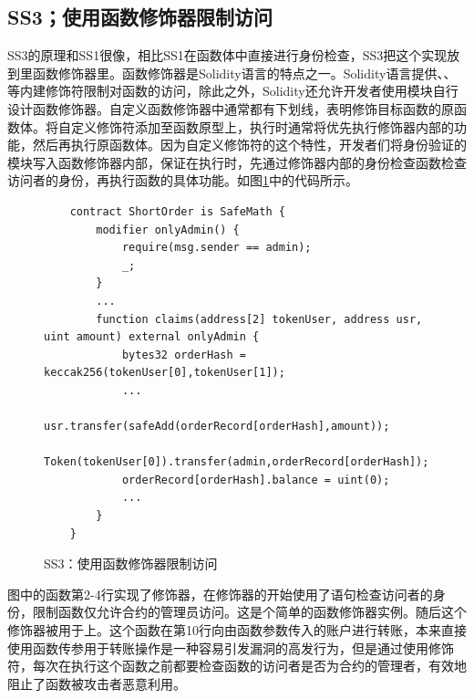 \subsection{SS3；使用函数修饰器限制访问}\label{sec:ss3}
SS3的原理和SS1很像，相比SS1在函数体中直接进行身份检查，SS3把这个实现放到里函数修饰器里。函数修饰器是Solidity语言的特点之一。Solidity语言提供、、等内建修饰符限制对函数的访问，除此之外，Solidity还允许开发者使用模块自行设计函数修饰器。自定义函数修饰器中通常都有下划线\codeff{\_;}，表明修饰目标函数的原函数体。将自定义修饰符添加至函数原型上，执行时通常将优先执行修饰器内部的功能，然后再执行原函数体。因为自定义修饰符的这个特性，开发者们将身份验证的模块写入函数修饰器内部，保证在执行时，先通过修饰器内部的身份检查函数检查访问者的身份，再执行函数的具体功能。如图\ref{fig:ss3_example}中的代码所示。
\begin{figure}
\begin{minipage}[htbp]{1.0\linewidth}
    \begin{lstlisting}
    contract ShortOrder is SafeMath {
        modifier onlyAdmin() {
            require(msg.sender == admin);
            _;
        }
        ...
        function claims(address[2] tokenUser, address usr, uint amount) external onlyAdmin {
            bytes32 orderHash = keccak256(tokenUser[0],tokenUser[1]);
            ...
            usr.transfer(safeAdd(orderRecord[orderHash],amount));
            Token(tokenUser[0]).transfer(admin,orderRecord[orderHash]);
            orderRecord[orderHash].balance = uint(0);
            ...
        }
    }
\end{lstlisting}
\end{minipage}
\vspace{-5mm}
\caption{SS3：使用函数修饰器限制访问}
\label{fig:ss3_example}
\end{figure}
图中的函数第2-4行实现了修饰器，在修饰器的开始使用了语句检查访问者的身份，限制函数仅允许合约的管理员访问。这是个简单的函数修饰器实例。随后这个修饰器被用于上。这个函数在第10行向由函数参数传入的账户进行转账，本来直接使用函数传参用于转账操作是一种容易引发漏洞的高发行为，但是通过使用修饰符，每次在执行这个函数之前都要检查函数的访问者是否为合约的管理者，有效地阻止了函数被攻击者恶意利用。

